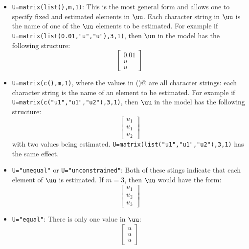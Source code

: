 \begin{itemize}\itemsep5pt
\item[] \texttt{U=matrix(list(),m,1)}: This is the most general form and allows one to specify fixed and estimated elements in $\uu$.   Each character string in $\uu$ is the name of one of the $\uu$ elements to be estimated.  For example if   \texttt{U=matrix(list(0.01,"u","u"),3,1)}, then $\uu$ in the model has the following structure:
\begin{equation*}
 \left[ \begin{array}{c}
    0.01 \\
    u \\
    u \end{array} \right]
\end{equation*}

\item[] \texttt{U=matrix(c(),m,1)}, where the values in \verb@c()@ are all character strings:  each character string is the name of an element to be estimated.  For example if   \texttt{U=matrix(c("u1","u1","u2"),3,1)}, then $\uu$ in the model has the following structure:
\begin{equation*}
 \left[ \begin{array}{c}
    u_1 \\
    u_1 \\
    u_2 \end{array} \right]
\end{equation*}
with two values being estimated.  \texttt{U=matrix(list("u1","u1","u2"),3,1)} has the same effect.

\item[] \texttt{U="unequal"} or \texttt{U="unconstrained"}: Both of these stings indicate that each element of $\uu$ is estimated. If $m=3$, then $\uu$ would have the form:
\begin{equation*}
 \left[ \begin{array}{c}
    u_1\\
    u_2\\
    u_3 \end{array} \right]
\end{equation*}

\item[] \texttt{U="equal"}: There is only one value in $\uu$:
\begin{equation*}
 \left[ \begin{array}{c}
    u \\
    u \\
    u \end{array} \right]
\end{equation*}


\end{itemize}
